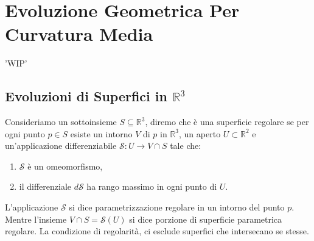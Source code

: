 \chapter{Evoluzione Geometrica Per Curvatura Media}
'WIP'
%
%
\section{Evoluzioni di Superfici in $\mathbb{R}^3$}

Consideriamo un sottoinsieme $S\subseteq\mathbb{R}^3$, diremo che è una superficie regolare se per ogni punto $p\in S$ esiste un intorno $V$ di $p$ in $\mathbb{R}^3$, un aperto $U\subset\mathbb{R}^2$ e un'applicazione differenziabile $\mathcal{S}:U\longrightarrow V\cap S$ tale che:
\begin{enumerate}
  \item $\mathcal{S}$ è un omeomorfismo,
  \item il differenziale $d\mathcal{S}$ ha rango massimo in ogni punto di $U$.
\end{enumerate}
L'applicazione $\mathcal{S}$ si dice parametrizzazione regolare in un intorno del punto $p$. Mentre l'insieme $V\cap S=\mathcal{S}(U)$ si dice porzione di superficie parametrica regolare. La condizione di regolarità, ci esclude superfici che intersecano se stesse.

